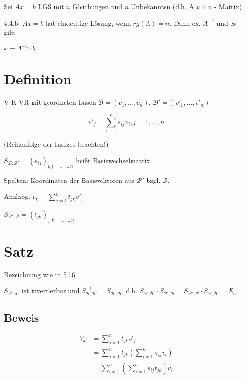 \documentclass[a4paper, openany]{book}
\begin{document}
        Sei $A x = b$ LGS mit $n$ Gleichungen und $n$ Unbekannten (d.h. A $n \times n$ - Matrix).

        4.4.b: $A x = b$ hat eindeutige Lösung, wenn $rg(A) = n$. Dann ex. $A^{-1}$ und es gilt:

        \begin{center}
          $x = A^{-1} \cdot b$
        \end{center}

        \section{Definition}

        V K-VR mit geordneten Basen $\mathcal{B} = (v_1, ..., v_n)$, $\mathcal{B'} = (v'_1, ..., v'_n)$

        \par \medskip

        \begin{equation}
          v'_j = \sum_{i=1}^n s_{ij}v_i, j = 1, ..., n
        \end{equation}

        (Reihenfolge der Indizes beachten!)

        $S_{\mathcal{B, B'}} = (s_{ij})_{i,j=1,...,n}$ heißt \underline{Basiswechselmatrix}

        \par \medskip

        Spalten: Koordinaten der Basisvektoren aus $\mathcal{B}'$ bzgl. $\mathcal{B}$.

        Analaog.  $v_k = \sum_{j=1}^n t_{jk} v'_j$

        $S_{\mathcal{B', B}} = (t_{jk})_{j,k=1,...,n}$

        \section{Satz}

        Bezeichnung wie in 5.16

        $S_{\mathcal{B, B'}}$ ist invertierbar und $S_{\mathcal{B, B'}}^{-1} = S_{\mathcal{B', B}}$, d.h. $S_{\mathcal{B, B'}} \cdot S_{\mathcal{B', B}} = S_{\mathcal{B', B}} \cdot S_{\mathcal{B, B'}} = E_n$

        \subsection{Beweis}

        \begin{align*}
          V_k & = \sum_{j=1}^n t_{jk} v'_j \\
              & = \sum_{j=1}^n t_{jk} (\sum_{i=1}^n s_{ij} v_i) \\
              & = \sum_{i=1}^n (\sum_{j=1}^n s_{ij} t_{jk})v_i 
        \end{align*}
\end{document}
